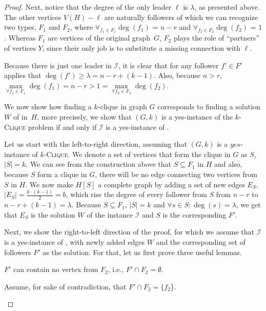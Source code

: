 \begin{proof}
    Next, notice that the degree of the only leader $\ell$ is $\lambda$, as presented above.
    The other vertices $V(H) - \ell$ are naturally followers of which we can recognize two types, $F_1$ and $F_2$,
    where $\forall_{f_1 \in F_1} \deg(f_1)$ = $n-r$ and $\forall_{f_2 \in F_2} \deg(f_2)$ = $1$.
    Whereas $F_1$ are vertices of the original graph~$G$,
    $F_2$ plays the role of ``partners'' of vertices $Y$, since their only job is to substitute a missing connection with $\ell$.

    Because there is just one leader in $\mathcal{I}$, it is clear that for any follower $f' \in F'$ applies that
    $\deg(f') \geq \lambda = n - r + (k - 1)$.
    Also, because $n > r$, $\max\limits_{\forall f_1 \in F_1}\deg(f_1) = n-r > 1 = \max\limits_{\forall f_2 \in F_2}\deg(f_2)$.
    
    We now show how finding a $k$-clique in graph $G$ corresponds to finding a solution $W$ of \HLshort in~$H$, more precisely,
    we show that $(G, k)$ is a yes-instance of the $k$-\textsc{Clique} problem if and only if $\mathcal{I}$ is a yes-instance of \HLdeg.

    Let us start with the left-to-right direction, assuming that $(G, k)$ is a $yes$-instance of $k$-\textsc{Clique}.
    We denote a set of vertices that form the clique in $G$ as $S$, $|S| = k$.
    We can see from the construction above that $S \subseteq F_1$ in $H$ and also, because $S$ form a clique in $G$,
    there will be no edge connecting two vertices from $S$ in $H$.
    We now make $H[S]$ a complete graph by adding a set of new edges $E_S$, $|E_S| = \frac{k\cdot(k-1)}{2} = b$,
    which rise the degree of every follower from $S$ from $n-r$ to $n-r+(k-1) = \lambda$.
    Because $S \subseteq F_1$, $|S| = k$ and $\forall s \in S \colon \deg(s) = \lambda$,
    we get that $E_S$ is the solution $W$ of the \HLshort instance $\mathcal{I}$ and $S$ is the corresponding $F'$. 

    Next, we show the right-to-left direction of the proof, for which we assume that $\mathcal{I}$ is a yes-instance of \HLdeg,
    with newly added edges $W$ and the corresponding set of followers $F'$ as the solution. 
    For that, let us first prove three useful lemmas.

    \begin{lemma}\label{lemmaInProof}
        $F'$ can contain no vertex from $F_2$, i.e., $F' \cap F_2 = \emptyset$.
    \end{lemma}
    \begin{subproof}
        Assume, for sake of contradiction, that $F' \cap F_2 = \{f_2$\}.
        

\end{subproof}
\end{proof}
